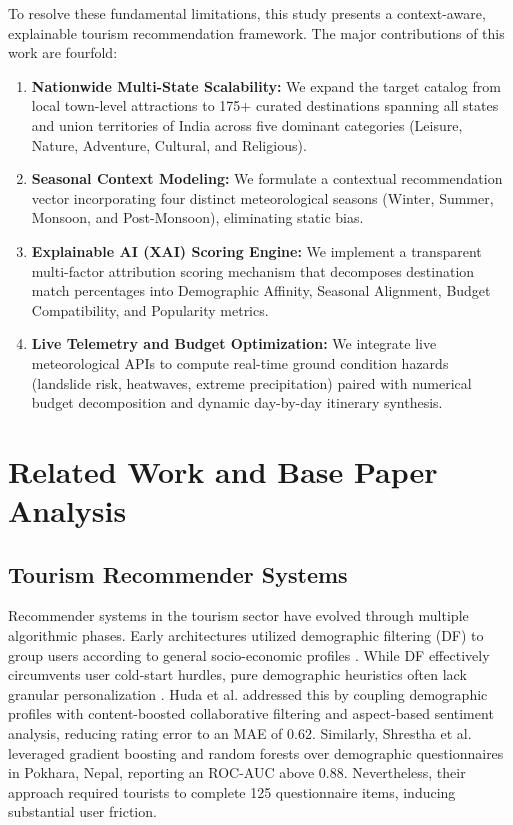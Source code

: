 \documentclass[conference]{IEEEtran}
\begin{document}
To resolve these fundamental limitations, this study presents a context-aware, explainable tourism recommendation framework. The major contributions of this work are fourfold:
\begin{enumerate}
    \item \textbf{Nationwide Multi-State Scalability:} We expand the target catalog from local town-level attractions to 175+ curated destinations spanning all states and union territories of India across five dominant categories (Leisure, Nature, Adventure, Cultural, and Religious).
    \item \textbf{Seasonal Context Modeling:} We formulate a contextual recommendation vector incorporating four distinct meteorological seasons (Winter, Summer, Monsoon, and Post-Monsoon), eliminating static bias.
    \item \textbf{Explainable AI (XAI) Scoring Engine:} We implement a transparent multi-factor attribution scoring mechanism that decomposes destination match percentages into Demographic Affinity, Seasonal Alignment, Budget Compatibility, and Popularity metrics.
    \item \textbf{Live Telemetry and Budget Optimization:} We integrate live meteorological APIs to compute real-time ground condition hazards (landslide risk, heatwaves, extreme precipitation) paired with numerical budget decomposition and dynamic day-by-day itinerary synthesis.
\end{enumerate}

\section{Related Work and Base Paper Analysis}
\subsection{Tourism Recommender Systems}
Recommender systems in the tourism sector have evolved through multiple algorithmic phases. Early architectures utilized demographic filtering (DF) to group users according to general socio-economic profiles \cite{pazzani1999framework}. While DF effectively circumvents user cold-start hurdles, pure demographic heuristics often lack granular personalization \cite{burke2002hybrid}. Huda et al. \cite{huda2024smart} addressed this by coupling demographic profiles with content-boosted collaborative filtering and aspect-based sentiment analysis, reducing rating error to an MAE of 0.62. Similarly, Shrestha et al. \cite{shrestha2024personalized} leveraged gradient boosting and random forests over demographic questionnaires in Pokhara, Nepal, reporting an ROC-AUC above 0.88. Nevertheless, their approach required tourists to complete 125 questionnaire items, inducing substantial user friction.
\end{document}
